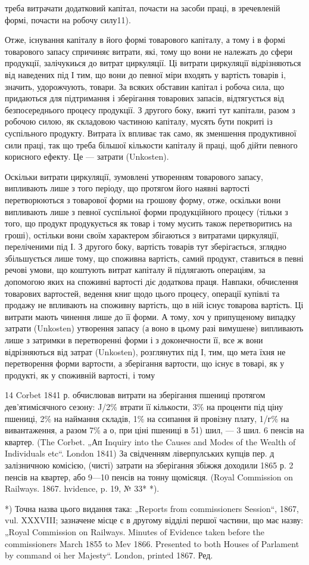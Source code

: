 треба витрачати додатковий капітал, почасти на засоби праці, в зречевленій
формі, почасти на робочу силу11).

Отже, існування капіталу в його формі товарового капіталу, а тому
і в формі товарового запасу спричиняє витрати, які, тому що вони не належать
до сфери продукції, залічукиься до витрат циркуляції. Ці витрати
циркуляції відрізняються від наведених під І тим, що вони до певної
міри входять у вартість товарів і, значить, удорожчують, товари. За всяких
обставин капітал і робоча сила, що придаються для підтримання і
зберігання товарових запасів, відтягується від безпосереднього процесу
продукції. З другого боку, вжиті тут капітали, разом з робочою силою,
як складовою частиною капіталу, мусять бути покриті із суспільного
продукту. Витрата їх впливає так само, як зменшення продуктивної сили
праці, так що треба більшої кількости капіталу й праці, щоб дійти певного
корисного ефекту. Це — затрати (Unkosten).

Оскільки витрати циркуляції, зумовлені утворенням товарового запасу,
випливають лише з того періоду, що протягом його наявні вартості
перетворюються з товарової форми на грошову форму, отже, оскільки
вони випливають лише з певної суспільної форми продукційного процесу
(тільки з того, що продукт продукується як товар і тому мусить також
перетворитись на гроші), остільки вони своїм характером збігаються з витратами
циркуляції, переліченими під І. З другого боку, вартість товарів тут зберігається,
зглядно збільшується лише тому, що споживна вартість, самий
продукт, ставиться в певні речові умови, що коштують витрат капіталу й
підлягають операціям, за допомогою яких на споживні вартості діє
додаткова праця. Навпаки, обчислення товарових вартостей, ведення книг
щодо цього процесу, операції купівлі та продажу не впливають на споживну
вартість, що в ній існує товарова вартість. Ці витрати мають
чинення лише до її форми. А тому, хоч у припущеному випадку
затрати (Unkosten) утворення запасу (а воно в цьому разі вимушене)
випливають лише з затримки в перетворенні форми і з доконечности її,
все ж вони відрізняються від затрат (Unkosten), розглянутих під І, тим,
що мета їхня не перетворення форми вартости, а зберігання вартости,
що існує в товарі, як у продукті, як у споживній вартості, і тому

14 Corbet 1841 р. обчислював витрати на зберігання пшениці протягом дев'ятимісячного
сезону: J/2\% втрати її кількости, 3\% на проценти під ціну пшениці,
2\% на наймання складів, 1\% на ссипання й провізну плату, 1/г\% на вивантаження,
а разом 7\% а о, при ціні пшениці в 51) шил, — 3 шил. 6 пенсів на
квартер. (The Corbet. „Ап Inquiry into the Causes and Modes of the Wealth of
Individuals etc“. London 1841) За свідченням ліверпулських купців пер. д залізничною
комісією, (чисті) затрати на зберігання збіжжя доходили 1865 р. 2 пенсів
на квартер, або 9—10 пенсів на тонну щомісяця. (Royal Commission on Railways.
1867. hvidence, p. 19, № 33* *).

*) Точна назва цього видання така: „Reports from commissioners Session“,
1867, vul. XXXVIII; зазначене місце є в другому відділі першої частини, що має
назву: „Royal Commission on Railways. Minutes of Evidence taken before the commissioners
March 1855 to Mev 1866. Presented to both Houses of Parlament by
command oi her Majesty“. London, printed 1867. Ред.
